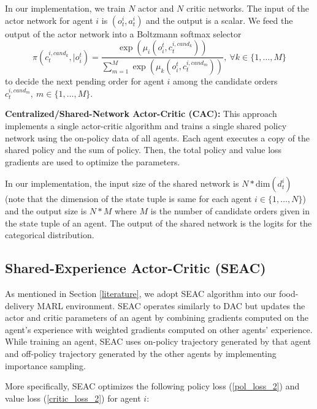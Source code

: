 \documentclass{article}
\theoremstyle{defn}
\theoremstyle{prop}
\theoremstyle{assm}
\theoremstyle{theoremm}
\theoremstyle{remarkk}
\theoremstyle{lem}
\theoremstyle{example}
\theoremstyle{example}
\begin{document}
In our implementation, we train $N$ actor and $N$ critic networks. The input of the actor network for agent $i$ is $(o_t^i,a_t^i)$ and the output is a scalar. We feed the output of the actor network into a Boltzmann softmax selector
\begin{equation}
\pi(c_t^{i,cand_k},|o^t_i)= \frac{\exp(\mu_i(o^t_i,c_t^{i,cand_k}))}{\sum\limits_{m=1}^{M} \exp(\mu_k(o^t_i,c_t^{i,cand_m}))}, \ \forall k \in \{1, \ldots, M\}
\end{equation} to decide the next pending order for agent $i$ among the candidate orders $c_t^{i,cand_m}, \ m \in \{1, \ldots, M\}$. 

\textbf{Centralized/Shared-Network Actor-Critic (CAC):} This approach implements a single actor-critic algorithm and trains a single shared policy network using the on-policy data of all agents. Each agent executes a copy of the shared policy and the sum of policy. Then, the total policy and value loss gradients are used to optimize the parameters. 

In our implementation, the input size of the shared network is  $N *\text{dim}(d^i_t)$ (note that the dimension of the state tuple is same for each agent $i \in \{1, \ldots, N\}$) and the output size is $N*M$ where $M$ is the number of candidate orders given in the state tuple of an agent. The output of the shared network is the logits for the categorical distribution. 
\subsection{Shared-Experience Actor-Critic (SEAC)}\label{seac}
As mentioned in Section \ref{literature}, we adopt SEAC \citep[see][]{christianos2020shared} algorithm into our food-delivery MARL environment. SEAC operates similarly to DAC but updates the actor and critic parameters of an agent by combining gradients computed on the agent’s experience with weighted gradients computed on other agents’ experience. While training an agent, SEAC uses on-policy trajectory generated by that agent and off-policy trajectory generated by the other agents by implementing importance sampling. 

More specifically, SEAC optimizes the following policy loss (\ref{pol_loss_2}) and value loss (\ref{critic_loss_2}) for agent $i$:
\end{document}
